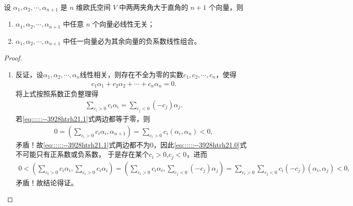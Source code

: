\documentclass[../../main.tex]{subfiles}%
\begin{document}
\begin{corollary}\label{corollary:例9.6}
设 $\alpha_1,\alpha_2,\cdots,\alpha_{n + 1}$ 是 $n$ 维欧氏空间 $V$ 中两两夹角大于直角的 $n + 1$ 个向量，则
\begin{enumerate}[(1)]
\item $\alpha_1,\alpha_2,\cdots,\alpha_{n + 1}$ 中任意 $n$ 个向量必线性无关；

\item $\alpha_1,\alpha_2,\cdots,\alpha_{n + 1}$ 中任一向量必为其余向量的负系数线性组合。
\end{enumerate}
\end{corollary}
\begin{proof}
\begin{enumerate}[(1)]
\item 反证，设$\alpha_1,\alpha_2,\cdots,\alpha_n$线性相关，则存在不全为零的实数$c_1,c_2,\cdots,c_n$，使得
\begin{align}
c_1\alpha_1+c_2\alpha_2+\cdots+c_n\alpha_n=0.\label{eq::::::--3928htrh21.0}
\end{align}
将上式按照系数正负整理得
\begin{align}
\sum\limits_{c_i>0}c_i\alpha_i=\sum\limits_{c_j<0}(-c_j)\alpha_j.\label{eq::::::--3928htrh21.1}
\end{align}
若\eqref{eq::::::--3928htrh21.1}式两边都等于零，则
\begin{align*}
0=\left(\sum\limits_{c_i>0}c_i\alpha_i,\alpha_{n+1}\right)=\sum\limits_{c_i>0}c_i(\alpha_i,\alpha_n)<0,
\end{align*}
矛盾！故\eqref{eq::::::--3928htrh21.1}式两边都不为0，因此\eqref{eq::::::--3928htrh21.0}式不可能只有正系数或负系数，
于是存在某个$c_i>0$,$c_j<0$，进而
\begin{align*}
0<\left(\sum\limits_{c_i>0}c_i\alpha_i,\sum\limits_{c_i>0}c_i\alpha_i\right)=\left(\sum\limits_{c_i>0}c_i\alpha_i,\sum\limits_{c_j<0}(-c_j)\alpha_j\right)=\sum\limits_{c_i>0}\sum\limits_{c_j<0}c_i(-c_j)(\alpha_i,\alpha_j)<0,
\end{align*}
矛盾！故结论得证。


\end{enumerate}
\end{proof}
\end{document}
